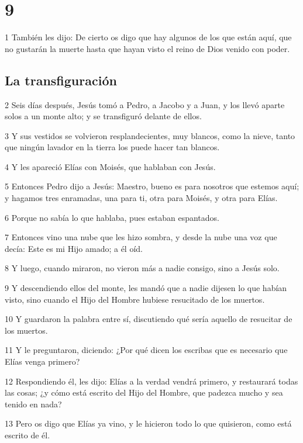 \chapter{9}

\par 1 También les dijo: De cierto os digo que hay algunos de los que están aquí, que no gustarán la muerte hasta que hayan visto el reino de Dios venido con poder.

\section*{La transfiguración}

\par 2 Seis días después, Jesús tomó a Pedro, a Jacobo y a Juan, y los llevó aparte solos a un monte alto; y se transfiguró delante de ellos.
\par 3 Y sus vestidos se volvieron resplandecientes, muy blancos, como la nieve, tanto que ningún lavador en la tierra los puede hacer tan blancos.
\par 4 Y les apareció Elías con Moisés, que hablaban con Jesús.
\par 5 Entonces Pedro dijo a Jesús: Maestro, bueno es para nosotros que estemos aquí; y hagamos tres enramadas, una para ti, otra para Moisés, y otra para Elías.
\par 6 Porque no sabía lo que hablaba, pues estaban espantados.
\par 7 Entonces vino una nube que les hizo sombra, y desde la nube una voz que decía: Este es mi Hijo amado; a él oíd.
\par 8 Y luego, cuando miraron, no vieron más a nadie consigo, sino a Jesús solo.
\par 9 Y descendiendo ellos del monte, les mandó que a nadie dijesen lo que habían visto, sino cuando el Hijo del Hombre hubiese resucitado de los muertos.
\par 10 Y guardaron la palabra entre sí, discutiendo qué sería aquello de resucitar de los muertos.
\par 11 Y le preguntaron, diciendo: ¿Por qué dicen los escribas que es necesario que Elías venga primero?
\par 12 Respondiendo él, les dijo: Elías a la verdad vendrá primero, y restaurará todas las cosas; ¿y cómo está escrito del Hijo del Hombre, que padezca mucho y sea tenido en nada?
\par 13 Pero os digo que Elías ya vino, y le hicieron todo lo que quisieron, como está escrito de él.

